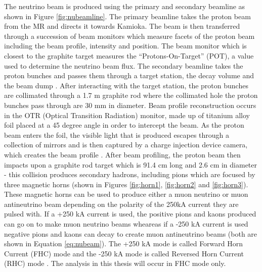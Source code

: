 The neutrino beam is produced using the primary and secondary beamline as shown in Figure \ref{fig:nubeamline}. The primary beamline takes the proton beam from the MR and directs it towards Kamioka. The beam is then transferred through a succession of beam monitors which measure facets of the proton beam including the beam profile, intensity and position. The beam monitor which is closest to the graphite target measures the ``Protons-On-Target'' (POT), a value used to determine the neutrino beam flux. The secondary beamline takes the proton bunches and passes them through a target station, the decay volume and the beam dump \cite{sekiguchi2008neutrino}. After interacting with the target station, the proton bunches are collimated through a 1.7 m graphite rod where the collimated hole the proton bunches pass through are 30 mm in diameter. Beam profile reconstruction occurs in the OTR (Optical Transition Radiation) monitor, made up of titanium alloy foil placed at a 45 degree angle in order to intercept the beam. As the proton beam enters the foil, the visible light that is produced escapes through a collection of mirrors and is then captured by a charge injection device camera, which creates the beam profile \cite{bhadra2013optical}. 
\newline
After beam profiling, the proton beam then impacts upon a graphite rod target which is 91.4 cm long and 2.6 cm in diameter - this collision produces secondary hadrons, including pions which are focused by three magnetic horns (shown in Figures \ref{fig:horn1}, \ref{fig:horn2} and \ref{fig:horn3}). These magnetic horns can be used to produce either a muon neutrino or muon antineutrino beam depending on the polarity of the 250kA current they are pulsed with. If a +250 kA current is used, the positive pions and kaons produced can go on to make muon neutrino beams wheareas if a -250 kA current is used negative pions and kaons can decay to create muon antineutrino beams (both are shown in Equation \ref{eq:nubeam}). The +250 kA mode is called Forward Horn Current (FHC) mode and the -250 kA mode is called Reversed Horn Current (RHC) mode \cite{sekiguchi2008t2k}. The analysis in this thesis will occur in FHC mode only. 


